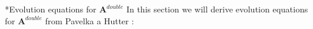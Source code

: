 \documentclass[oneside, a4paper, onecolumn, 11pt]{article}
\renewcommand{\AA}{\mathbf{A}}
\newcommand{\xx}{\mathbf{x}}
\newcommand{\XX}{\mathbf{X}}
\newcommand{\Ad}{\mathbf{A}^{double}}
\begin{document}
\begin{section}
\begin{subsection}
\begin{subsubsection}
\end{subsubsection}


\begin{subsubsection}*{Evolution equations for $\Ad$}
    In this section we will derive evolution equations for $\Ad$
from Pavelka a Hutter \cite{hutter-pavelka}:


\end{subsubsection}
\end{subsection}
\end{section}
\end{document}
